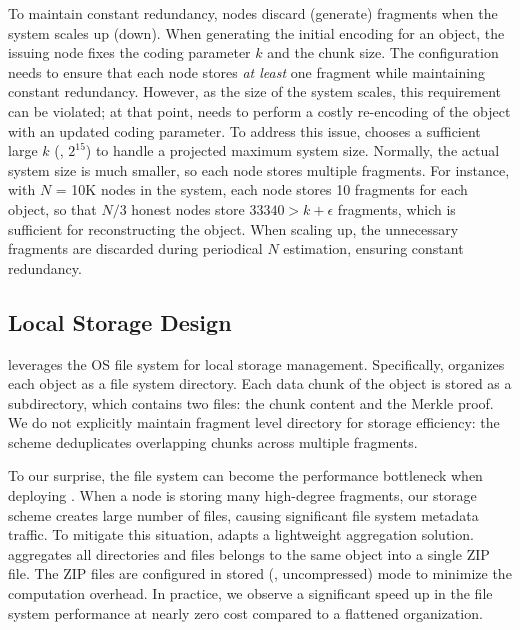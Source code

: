 To maintain constant redundancy, \sys nodes discard (generate) fragments when the system scales up (down).
When generating the initial encoding for an object, the issuing node fixes the coding parameter $k$ and the chunk size.
The configuration needs to ensure that each node stores \emph{at least} one fragment while maintaining constant redundancy.
However, as the size of the system scales, this requirement can be violated;
at that point, \sys needs to perform a costly re-encoding of the object with an updated coding parameter.
To address this issue, \sys chooses a sufficient large $k$ (\eg, $2^{15}$) to handle a projected maximum system size.
Normally, the actual system size is much smaller, so each node stores multiple fragments.
For instance, with $N$ = 10K nodes in the system, each node stores 10 fragments for each object, so that $N/3$ honest nodes store $33340 > k + \epsilon$ fragments, which is sufficient for reconstructing the object.
When scaling up, the unnecessary fragments are discarded during periodical $N$ estimation, ensuring constant redundancy.

\subsection{Local Storage Design}
\label{sec:optz:local}

\sys leverages the OS file system for local storage management.
Specifically, \sys organizes each object as a file system directory.
Each data chunk of the object is stored as a subdirectory, which contains two files: the chunk content and the Merkle proof.
We do not explicitly maintain fragment level directory for storage efficiency:
the scheme deduplicates overlapping chunks across multiple fragments.

To our surprise, the file system can become the performance bottleneck when deploying \sys.
When a node is storing many high-degree fragments, our storage scheme creates large number of files, causing significant file system metadata traffic.
To mitigate this situation, \sys adapts a lightweight aggregation solution.
\sys aggregates all directories and files belongs to the same object into a single ZIP file.
The ZIP files are configured in stored (\ie, uncompressed) mode to minimize the computation overhead.
In practice, we observe a significant speed up in the file system performance at nearly zero cost compared to a flattened organization.



